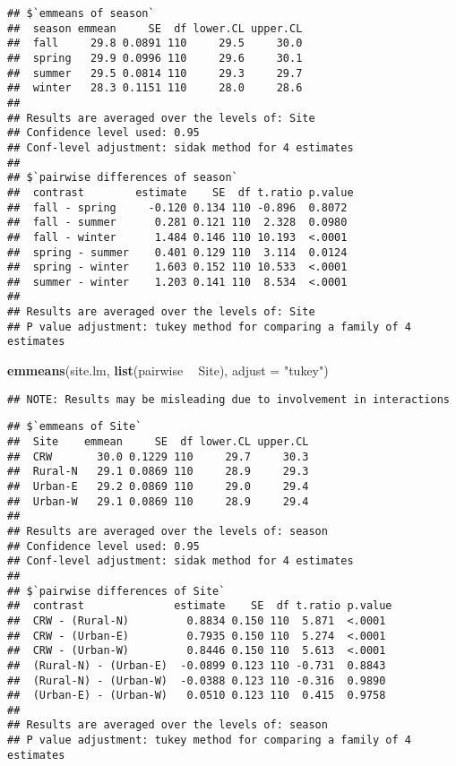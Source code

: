 \documentclass[
]{article}
\newenvironment{Shaded}{\begin{snugshade}}{\end{snugshade}}
\newcommand{\DataTypeTok}[1]{\textcolor[rgb]{0.13,0.29,0.53}{#1}}
\newcommand{\KeywordTok}[1]{\textcolor[rgb]{0.13,0.29,0.53}{\textbf{#1}}}
\newcommand{\NormalTok}[1]{#1}
\newcommand{\OperatorTok}[1]{\textcolor[rgb]{0.81,0.36,0.00}{\textbf{#1}}}
\newcommand{\StringTok}[1]{\textcolor[rgb]{0.31,0.60,0.02}{#1}}
\begin{document}
\begin{verbatim}
## $`emmeans of season`
##  season emmean     SE  df lower.CL upper.CL
##  fall     29.8 0.0891 110     29.5     30.0
##  spring   29.9 0.0996 110     29.6     30.1
##  summer   29.5 0.0814 110     29.3     29.7
##  winter   28.3 0.1151 110     28.0     28.6
## 
## Results are averaged over the levels of: Site 
## Confidence level used: 0.95 
## Conf-level adjustment: sidak method for 4 estimates 
## 
## $`pairwise differences of season`
##  contrast        estimate    SE  df t.ratio p.value
##  fall - spring     -0.120 0.134 110 -0.896  0.8072 
##  fall - summer      0.281 0.121 110  2.328  0.0980 
##  fall - winter      1.484 0.146 110 10.193  <.0001 
##  spring - summer    0.401 0.129 110  3.114  0.0124 
##  spring - winter    1.603 0.152 110 10.533  <.0001 
##  summer - winter    1.203 0.141 110  8.534  <.0001 
## 
## Results are averaged over the levels of: Site 
## P value adjustment: tukey method for comparing a family of 4 estimates
\end{verbatim}

\begin{Shaded}
\begin{Highlighting}[]
\KeywordTok{emmeans}\NormalTok{(site.lm, }\KeywordTok{list}\NormalTok{(pairwise }\OperatorTok{~}\StringTok{ }\NormalTok{Site), }\DataTypeTok{adjust =} \StringTok{"tukey"}\NormalTok{)}
\end{Highlighting}
\end{Shaded}

\begin{verbatim}
## NOTE: Results may be misleading due to involvement in interactions
\end{verbatim}

\begin{verbatim}
## $`emmeans of Site`
##  Site    emmean     SE  df lower.CL upper.CL
##  CRW       30.0 0.1229 110     29.7     30.3
##  Rural-N   29.1 0.0869 110     28.9     29.3
##  Urban-E   29.2 0.0869 110     29.0     29.4
##  Urban-W   29.1 0.0869 110     28.9     29.4
## 
## Results are averaged over the levels of: season 
## Confidence level used: 0.95 
## Conf-level adjustment: sidak method for 4 estimates 
## 
## $`pairwise differences of Site`
##  contrast              estimate    SE  df t.ratio p.value
##  CRW - (Rural-N)         0.8834 0.150 110  5.871  <.0001 
##  CRW - (Urban-E)         0.7935 0.150 110  5.274  <.0001 
##  CRW - (Urban-W)         0.8446 0.150 110  5.613  <.0001 
##  (Rural-N) - (Urban-E)  -0.0899 0.123 110 -0.731  0.8843 
##  (Rural-N) - (Urban-W)  -0.0388 0.123 110 -0.316  0.9890 
##  (Urban-E) - (Urban-W)   0.0510 0.123 110  0.415  0.9758 
## 
## Results are averaged over the levels of: season 
## P value adjustment: tukey method for comparing a family of 4 estimates
\end{verbatim}
\end{document}
